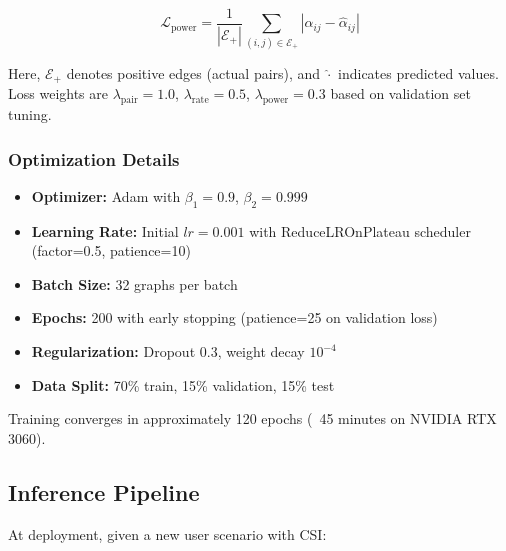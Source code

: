 \begin{equation}
\mathcal{L}_{\text{power}} = \frac{1}{|\mathcal{E}_+|} \sum_{(i,j) \in \mathcal{E}_+} |\alpha_{ij} - \hat{\alpha}_{ij}|
\end{equation}

Here, $\mathcal{E}_+$ denotes positive edges (actual pairs), and $\hat{\cdot}$ indicates predicted values. Loss weights are $\lambda_{\text{pair}} = 1.0$, $\lambda_{\text{rate}} = 0.5$, $\lambda_{\text{power}} = 0.3$ based on validation set tuning.

\subsubsection{Optimization Details}

\begin{itemize}
    \item \textbf{Optimizer:} Adam with $\beta_1 = 0.9$, $\beta_2 = 0.999$
    \item \textbf{Learning Rate:} Initial $lr = 0.001$ with ReduceLROnPlateau scheduler (factor=0.5, patience=10)
    \item \textbf{Batch Size:} 32 graphs per batch
    \item \textbf{Epochs:} 200 with early stopping (patience=25 on validation loss)
    \item \textbf{Regularization:} Dropout 0.3, weight decay $10^{-4}$
    \item \textbf{Data Split:} 70\% train, 15\% validation, 15\% test
\end{itemize}

Training converges in approximately 120 epochs (~45 minutes on NVIDIA RTX 3060).

\subsection{Inference Pipeline}

At deployment, given a new user scenario with CSI:

